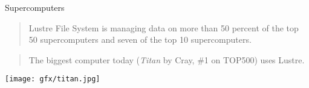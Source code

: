 \begin{frame}{Supercomputers}
    \begin{quote}
        Lustre File System is managing data on more than 50 percent of the top
        50 supercomputers and seven of the top 10 supercomputers.

        \hspace*{}
    \end{quote}

    \vspace{0.5cm}

    \begin{quote}
        The biggest computer today (\emph{Titan} by Cray, \#1 on TOP500) uses Lustre.
    \end{quote}

    \center\texttt{[image: gfx/titan.jpg]}
\end{frame}
